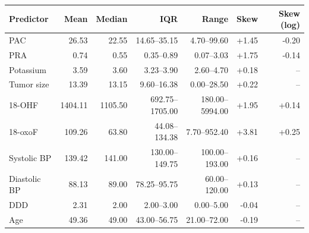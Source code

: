 \begin{tabular}{lrrrrrr}
\toprule
Predictor & Mean & Median & IQR & Range & Skew & Skew (log) \\
\midrule
PAC & 26.53 & 22.55 & 14.65--35.15 & 4.70--99.60 & +1.45 & -0.20 \\
PRA & 0.74 & 0.55 & 0.35--0.89 & 0.07--3.03 & +1.75 & -0.14 \\
Potassium & 3.59 & 3.60 & 3.23--3.90 & 2.60--4.70 & +0.18 & -- \\
Tumor size & 13.39 & 13.15 & 9.60--16.38 & 0.00--28.50 & +0.22 & -- \\
18-OHF & 1404.11 & 1105.50 & 692.75--1705.00 & 180.00--5994.00 & +1.95 & +0.14 \\
18-oxoF & 109.26 & 63.80 & 44.08--134.38 & 7.70--952.40 & +3.81 & +0.25 \\
Systolic BP & 139.42 & 141.00 & 130.00--149.75 & 100.00--193.00 & +0.16 & -- \\
Diastolic BP & 88.13 & 89.00 & 78.25--95.75 & 60.00--120.00 & +0.13 & -- \\
DDD & 2.31 & 2.00 & 2.00--3.00 & 0.00--5.00 & -0.04 & -- \\
Age & 49.36 & 49.00 & 43.00--56.75 & 21.00--72.00 & -0.19 & -- \\
\bottomrule
\end{tabular}
